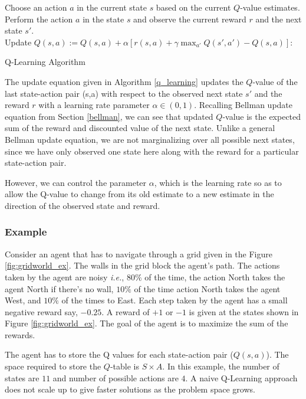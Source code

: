 \documentclass[12pt]{report}
\newcommand{\ie}{\textit{i.e.}}
\begin{document}
\begin{algorithm}
{Choose an action $a$ in the current state $s$ based on the current $Q$-value estimates.\\
Perform the action $a$ in the state $s$ and observe the current reward $r$ and the next state $s'$.\\
Update $Q(s,a) := Q(s,a) + \alpha [r(s,a) + \gamma \max_{a'}Q(s',a') - Q(s,a)]$:
}
\caption{Q-Learning Algorithm}\label{q_learning}
\end{algorithm}
The update equation given in Algorithm \ref{q_learning} updates the $Q$-value of the last state-action pair (s,a) with respect to the observed next state $s'$ and the reward $r$ with a learning rate parameter $\alpha \in (0,1)$. Recalling Bellman update equation from Section \ref{bellman}, we can see that updated $Q$-value is the expected sum of the reward and discounted value of the next state. Unlike a general Bellman update equation, we are not marginalizing over all possible next states, since we have only observed one state here along with the reward for a particular state-action pair.\par 
However, we can control the parameter $\alpha$, which is the learning rate so as to allow the Q-value to change from its old estimate to a new estimate in the direction of the observed state and reward.

\subsubsection{Example}
Consider an agent that has to navigate through a grid given in the Figure \ref{fig:gridworld_ex}. The walls in the grid block the agent's path. The actions taken by the agent are noisy \ie,  $80\%$ of the time, the action North takes the agent North if there's no wall, $10\%$ of the time action North takes the agent West, and $10\%$ of the times to East. Each step taken by the agent has a small negative reward say, $-0.25$. A reward of $+1$ or $-1$ is given at the states shown in Figure \ref{fig:gridworld_ex}. The goal of the agent is to maximize the sum of the rewards. \par 
The agent has to store the Q values for each state-action pair ($Q(s,a)$). The space required to store the $Q$-table is $S \times A$. In this example, the number of states are $11$ and number of possible actions are $4$. A naive Q-Learning approach does not scale up to give faster solutions as the problem space grows. 
\end{document}
